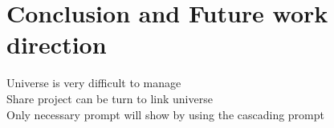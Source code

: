 \chapter{Conclusion and Future work direction}
Universe is very difficult to manage\\
Share project can be turn to link universe\\
Only necessary prompt will show by using the cascading prompt